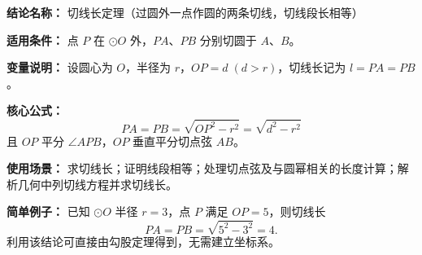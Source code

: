 \textbf{结论名称：} 切线长定理（过圆外一点作圆的两条切线，切线段长相等）

\textbf{适用条件：} 点 \(P\) 在 \(\odot O\) 外，\(PA\)、\(PB\) 分别切圆于 \(A\)、\(B\)。

\textbf{变量说明：} 设圆心为 \(O\)，半径为 \(r\)，\(OP = d\;(d>r)\)，切线长记为 \(l = PA = PB\)。

\textbf{核心公式：}
\[
\boxed{PA = PB = \sqrt{OP^{2} - r^{2}} = \sqrt{d^{2} - r^{2}}}
\]
且 \(OP\) 平分 \(\angle APB\)，\(OP\) 垂直平分切点弦 \(AB\)。

\textbf{使用场景：} 求切线长；证明线段相等；处理切点弦及与圆幂相关的长度计算；解析几何中列切线方程并求切线长。

\textbf{简单例子：} 已知 \(\odot O\) 半径 \(r=3\)，点 \(P\) 满足 \(OP=5\)，则切线长
\[
PA = PB = \sqrt{5^{2} - 3^{2}} = 4.
\]
利用该结论可直接由勾股定理得到，无需建立坐标系。